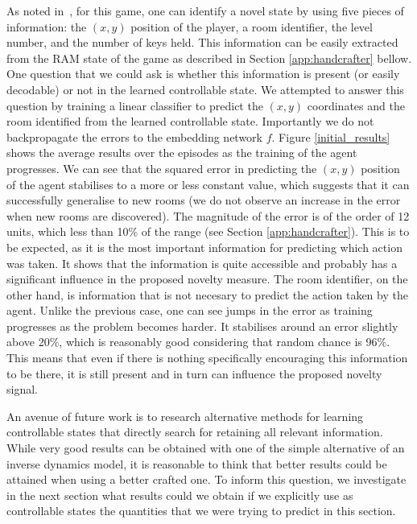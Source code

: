\documentclass{article} %
\begin{document}
As noted in~\cite{burda2018exploration}, for this game, one can identify a novel state by using five pieces of information: the $(x,y)$ position of the player, a room identifier, the level number, and the number of keys held. This information can be easily extracted from the RAM state of the game as described in Section \ref{app:handcrafter} bellow. 
%
One question that we could ask is whether this information is present (or easily decodable) or not in the learned controllable state.
%
We attempted to answer this question by training a linear classifier to predict the $(x, y)$ coordinates and the room identified from the learned controllable state. Importantly we do not backpropagate the errors to the embedding network $f$. Figure \ref{initial_results} shows the average results over the episodes as the training of the agent progresses. We can see that the squared error in predicting the $(x, y)$ position of the agent stabilises to a more or less constant value, which suggests that it can successfully generalise to new rooms (we do not observe an increase in the error when new rooms are discovered). The magnitude of the error is of the order of 12 units, which less than 10\% of the range (see Section \ref{app:handcrafter}). This is to be expected, as it is the most important information for predicting which action was taken. It shows that the information is quite accessible and probably has a significant influence in the proposed novelty measure.
%
The room identifier, on the other hand, is information that is not necesary to predict the action taken by the agent. Unlike the previous case, one can see jumps in the error as training progresses as the problem becomes harder. It stabilises around an error slightly above 20\%, which is reasonably good considering that random chance is 96\%. This means that even if there is nothing specifically encouraging this information to be there, it is still present and in turn can influence the proposed novelty signal.

An avenue of future work is to research alternative methods for learning controllable states that directly search for retaining all relevant information. While very good results can be obtained with one of the simple alternative of an inverse dynamics model, it is reasonable to think that better results could be attained when using a better crafted one. To inform this question, we investigate in the next section what results could we obtain if we explicitly use as controllable states the quantities that we were trying to predict in this section.
\end{document}
